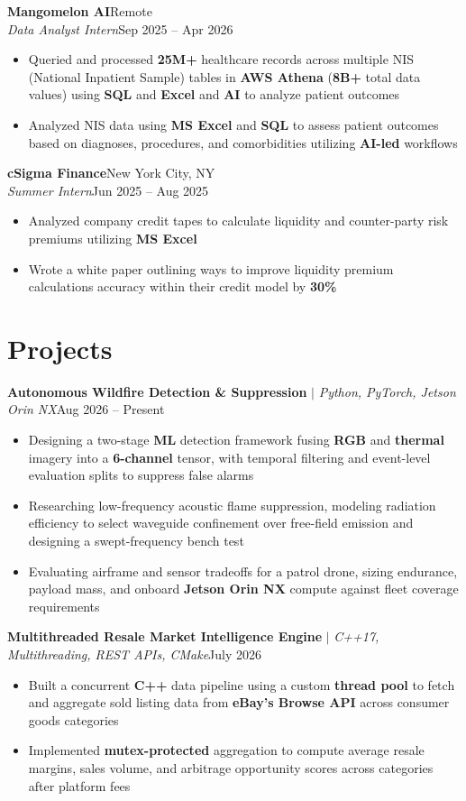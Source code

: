 \documentclass[letterpaper,10pt]{article}
\newcommand{\headerrow}[2]{#1\hfill #2\\}
\newcommand{\entry}[4]{%
  \headerrow{\textbf{#1}}{#2}%
  \headerrow{\textit{#3}}{#4}%
}
\newcommand{\project}[3]{%
  \headerrow{\textbf{#1} $|$ \textit{#2}}{#3}%
}
\newenvironment{bullets}
  {\begin{itemize}[leftmargin=*,labelsep=0.5em,topsep=1pt,itemsep=0pt,parsep=0pt]}
  {\end{itemize}\vspace{1pt}}
\begin{document}
\entry{Mangomelon AI}{Remote}
      {Data Analyst Intern}{Sep 2025 -- Apr 2026}
\begin{bullets}
  \item Queried and processed \textbf{25M+} healthcare records across multiple NIS (National Inpatient Sample) tables in \textbf{AWS Athena} (\textbf{8B+} total data values) using \textbf{SQL} and \textbf{Excel} and \textbf{AI} to analyze patient outcomes
  \item Analyzed NIS data using \textbf{MS Excel} and \textbf{SQL} to assess patient outcomes based on diagnoses, procedures, and comorbidities utilizing \textbf{AI-led} workflows
\end{bullets}

\entry{cSigma Finance}{New York City, NY}
      {Summer Intern}{Jun 2025 -- Aug 2025}
\begin{bullets}
  \item Analyzed company credit tapes to calculate liquidity and counter-party risk premiums utilizing \textbf{MS Excel}
  \item Wrote a white paper outlining ways to improve liquidity premium calculations accuracy within their credit model by \textbf{30\%}
\end{bullets}

\section{Projects}

\project{Autonomous Wildfire Detection \& Suppression}{Python, PyTorch, Jetson Orin NX}{Aug 2026 -- Present}
\begin{bullets}
  \item Designing a two-stage \textbf{ML} detection framework fusing \textbf{RGB} and \textbf{thermal} imagery into a \textbf{6-channel} tensor, with temporal filtering and event-level evaluation splits to suppress false alarms
  \item Researching low-frequency acoustic flame suppression, modeling radiation efficiency to select waveguide confinement over free-field emission and designing a swept-frequency bench test
  \item Evaluating airframe and sensor tradeoffs for a patrol drone, sizing endurance, payload mass, and onboard \textbf{Jetson Orin NX} compute against fleet coverage requirements
\end{bullets}

\project{Multithreaded Resale Market Intelligence Engine}{C++17, Multithreading, REST APIs, CMake}{July 2026}
\begin{bullets}
  \item Built a concurrent \textbf{C++} data pipeline using a custom \textbf{thread pool} to fetch and aggregate sold listing data from \textbf{eBay's Browse API} across consumer goods categories
  \item Implemented \textbf{mutex-protected} aggregation to compute average resale margins, sales volume, and arbitrage opportunity scores across categories after platform fees
\end{bullets}
\end{document}
